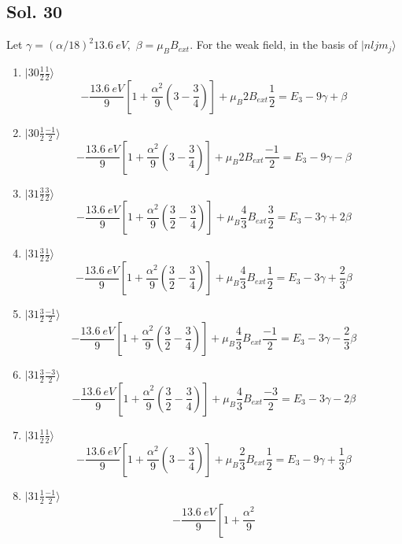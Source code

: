 \subsection*{Sol. 30}
Let $\gamma = (\alpha/18)^2\qty{13.6}{eV},$ $\beta=\mu_BB_{ext}.$
For the weak field, in the basis of $|nljm_j\rangle$
\begin{enumerate}
    \item 
    $|30\frac{1}{2}\frac{1}{2}\rangle$
    $$
    -\frac{\qty{13.6}{eV}}{9}
    \left[
    1 + \frac{\alpha^2}{9}
    \left(
    3-\frac{3}4{}
    \right)
    \right] + \mu_B 2B_{ext}\frac{1}{2}
    =E_3 - 9\gamma + \beta
    $$
    \item $|30\frac{1}{2}\frac{-1}{2}\rangle$
    $$
    -\frac{\qty{13.6}{eV}}{9}
    \left[
    1 + \frac{\alpha^2}{9}
    \left(
    3-\frac{3}4{}
    \right)
    \right] + \mu_B 2B_{ext}\frac{-1}{2}
    =E_3 - 9\gamma - \beta
    $$
    \item 
    $|31\frac{3}{2}\frac{3}{2}\rangle$
    $$
    -\frac{\qty{13.6}{eV}}{9}
    \left[
    1 + \frac{\alpha^2}{9}
    \left(
    \frac{3}{2}-\frac{3}4{}
    \right)
    \right] + \mu_B \frac{4}{3}B_{ext}\frac{3}{2}
    =E_3 - 3\gamma + 2\beta
    $$
    \item 
    $|31\frac{3}{2}\frac{1}{2}\rangle$
    $$
    -\frac{\qty{13.6}{eV}}{9}
    \left[
    1 + \frac{\alpha^2}{9}
    \left(
    \frac{3}{2}-\frac{3}4{}
    \right)
    \right] + \mu_B \frac{4}{3}B_{ext}\frac{1}{2}
    =E_3 - 3\gamma + \frac{2}{3}\beta
    $$
    \item 
    $|31\frac{3}{2}\frac{-1}{2}\rangle$
    $$
    -\frac{\qty{13.6}{eV}}{9}
    \left[
    1 + \frac{\alpha^2}{9}
    \left(
    \frac{3}{2}-\frac{3}4{}
    \right)
    \right] + \mu_B \frac{4}{3}B_{ext}\frac{-1}{2}
    =E_3 - 3\gamma - \frac{2}{3}\beta
    $$
    \item 
    $|31\frac{3}{2}\frac{-3}{2}\rangle$
    $$
    -\frac{\qty{13.6}{eV}}{9}
    \left[
    1 + \frac{\alpha^2}{9}
    \left(
    \frac{3}{2}-\frac{3}4{}
    \right)
    \right] + \mu_B \frac{4}{3}B_{ext}\frac{-3}{2}
    =E_3 - 3\gamma - 2\beta
    $$
    \item 
    $|31\frac{1}{2}\frac{1}{2}\rangle$
    $$
    -\frac{\qty{13.6}{eV}}{9}
    \left[
    1 + \frac{\alpha^2}{9}
    \left(
    3-\frac{3}4{}
    \right)
    \right] + \mu_B \frac{2}{3}B_{ext}\frac{1}{2}
    =E_3 - 9\gamma + \frac{1}{3}\beta
    $$
    \item 
    $|31\frac{1}{2}\frac{-1}{2}\rangle$
    $$
    -\frac{\qty{13.6}{eV}}{9}
    \left[
    1 + \frac{\alpha^2}{9}
$$
\end{enumerate}
